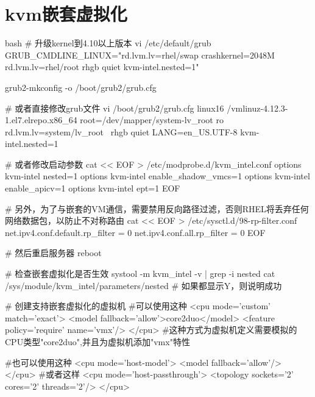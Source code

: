 \section{kvm嵌套虚拟化}
\begin{code-block}{bash}
# 升级kernel到4.10以上版本
vi /etc/default/grub
GRUB_CMDLINE_LINUX="rd.lvm.lv=rhel/swap crashkernel=2048M rd.lvm.lv=rhel/root rhgb quiet kvm-intel.nested=1"

grub2-mkconfig -o /boot/grub2/grub.cfg

# 或者直接修改grub文件
vi /boot/grub2/grub.cfg
linux16 /vmlinuz-4.12.3-1.el7.elrepo.x86_64 root=/dev/mapper/system-lv_root ro rd.lvm.lv=system/lv_root \
    rhgb quiet LANG=en_US.UTF-8 kvm-intel.nested=1

# 或者修改启动参数
cat << EOF > /etc/modprobe.d/kvm_intel.conf
options kvm-intel nested=1
options kvm-intel enable_shadow_vmcs=1
options kvm-intel enable_apicv=1
options kvm-intel ept=1
EOF

# 另外，为了与嵌套的VM通信，需要禁用反向路径过滤，否则RHEL将丢弃任何网络数据包，以防止不对称路由
cat << EOF > /etc/sysctl.d/98-rp-filter.conf
net.ipv4.conf.default.rp_filter = 0
net.ipv4.conf.all.rp_filter = 0
EOF

# 然后重启服务器
reboot

# 检查嵌套虚拟化是否生效
systool -m kvm_intel -v   | grep -i nested
cat /sys/module/kvm_intel/parameters/nested
# 如果都显示Y，则说明成功

# 创建支持嵌套虚拟化的虚拟机
#可以使用这种
  <cpu mode='custom' match='exact'>
    <model fallback='allow'>core2duo</model>
    <feature policy='require' name='vmx'/>
  </cpu>
#这种方式为虚拟机定义需要模拟的CPU类型"core2duo",并且为虚拟机添加"vmx"特性

#也可以使用这种
  <cpu mode='host-model'>
    <model fallback='allow'/>
  </cpu>
#或者这样
 <cpu mode='host-passthrough'>
    <topology sockets='2' cores='2' threads='2'/>
 </cpu>
\end{code-block}

